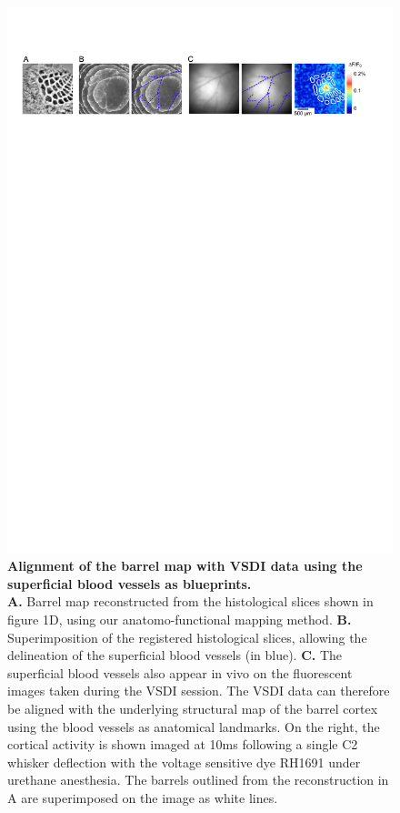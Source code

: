 \begin{figure}[!ht]
\centering
\includegraphics[width=190mm]{images/Perronnet-Figure2}
\caption{
	 \textbf{Alignment of the barrel map with VSDI data using the superficial blood vessels as blueprints.} \\
	 \textbf{A.} Barrel map reconstructed from the histological slices shown in figure 1D, using our anatomo-functional mapping method.
	 \textbf{B.} Superimposition of the registered histological slices, allowing the delineation of the superficial blood vessels (in blue).  
	 \textbf{C.} The superficial blood vessels also appear in vivo on the fluorescent images taken during the VSDI session. The VSDI data can therefore be aligned with the underlying structural map of the barrel cortex using the blood vessels as anatomical landmarks. On the right, the cortical activity is shown imaged at 10ms following a single C2 whisker deflection with the voltage sensitive dye RH1691 under urethane anesthesia. The barrels outlined from the reconstruction in A are superimposed on the image as white lines.
}
\label{fig-alignement-superposition}  
\end{figure}



